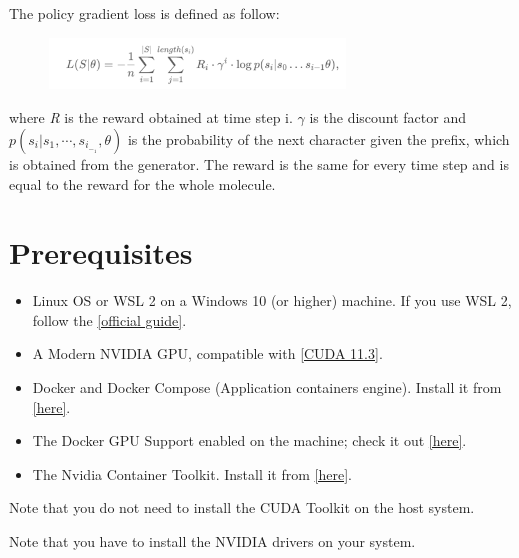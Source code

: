 \documentclass[a4paper]{article}
\begin{document}
The policy gradient loss is defined as follow:

\begin{figure}[htbp]
		\centering
			\includegraphics[width=0.70\textwidth]{formula.png}
		\label{fig:formula}
	\end{figure}

where \textit{R} is the reward obtained at time step i. \begin{math}\gamma\end{math} is the discount factor and \begin{math} p(s_i | s_1,\cdots ,s_i_-_1,\theta) \end{math} is the probability of the next character given the prefix, which is obtained from the generator. The reward is the same for every time step and is equal to the reward for the whole molecule. 

\section{Prerequisites}\label{sec:Prerequisites}
\begin{itemize}
	\item Linux OS or WSL 2 on a Windows 10 (or higher) machine. If you use WSL 2, follow the \href{https://docs.nvidia.com/cuda/wsl-user-guide/index.html#getting-started-with-cuda-on-wsl}{[official guide]}.
	\item A Modern NVIDIA GPU, compatible with \href{https://developer.nvidia.com/cuda-11.3.0-download-archive}{[CUDA 11.3]}.
	\item Docker and Docker Compose (Application containers engine). Install it from \href{https://www.docker.com}{[here]}.
	\item The Docker GPU Support enabled on the machine; check it out \href{https://docs.docker.com/compose/gpu-support/}{[here]}.
	\item The Nvidia Container Toolkit. Install it from \href{https://docs.nvidia.com/datacenter/cloud-native/container-toolkit/install-guide.html#install-guide}{[here]}.
\end{itemize}

\begin{flushleft}
Note that you do not need to install the CUDA Toolkit on the host system.

Note that you have to install the NVIDIA drivers on your system.
\end{flushleft}
\end{document}
